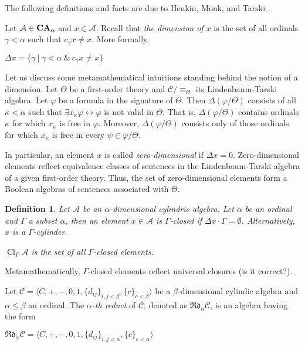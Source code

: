 \documentclass[a4paper]{article}
\theoremstyle{defin}
\newtheorem{defin}{Definition}
\theoremstyle{theorem}
\theoremstyle{prop}
\theoremstyle{lemma}
\theoremstyle{fact}
\theoremstyle{ex}
\theoremstyle{col}
\begin{document}
The following definitions and facts are due to Henkin, Monk, and Tarski \cite{henkin1971cylindric}.

Let $\mathcal{A} \in {\bf CA}_{\alpha}$ and $x \in \mathcal{A}$. Recall that \emph{the dimension of $x$}
is the set of all ordinals $\gamma < \alpha$ such that $c_\gamma x \neq x$. More formally,
\begin{center}
  $\Delta x = \{ \gamma \: | \: \gamma < \alpha \: \& \: c_\gamma x \neq x\}$
\end{center}

Let us discuss some metamathematical intuitions standing behind the notion of a dimension. Let $\Theta$ be a first-order theory and $\mathcal{C}/\equiv_{\Theta}$ its Lindenbaum-Tarski algebra. Let $\varphi$ be a formula in the signature of $\Theta$. Then $\Delta(\varphi/\Theta)$ consists of all $\kappa < \alpha$ such that $\exists x_{\kappa} \varphi \leftrightarrow \varphi$ is not valid in $\Theta$.
That is, $\Delta(\varphi/\Theta)$ contains ordinals $\kappa$ for which $x_{\kappa}$ is free in $\varphi$. Moreover, $\Delta(\varphi/\Theta)$ consists only of those ordinals for which $x_{\kappa}$ is free in every $\psi \in \varphi/\Theta$.

In particular, an element $x$ is called \emph{zero-dimensional} if $\Delta x = 0$. Zero-dimensional elements reflect equivalence classes of sentences in the Lindenbaum-Tarski algebra of a given first-order theory. Thus, the set of zero-dimensional elements form a Boolean algebras of sentences associated with $\Theta$.

\begin{defin}
  Let $\mathcal{A}$ be an $\alpha$-dimensional cylindric algebra. Let $\alpha$ be an ordinal and $\Gamma$ a subset $\alpha$, then an element $x \in \mathcal{A}$ is $\Gamma$-closed if $\Delta x \cdot \Gamma = \emptyset$. Alternatively, $x$ is a $\Gamma$-cylinder.

 $\operatorname{Cl}_{\Gamma}\mathcal{A}$ is the set of all $\Gamma$-closed elements.
\end{defin}

Metamathematically, $\Gamma$-closed elements reflect universal closures (is it correct?).

Let $\mathcal{C} = \langle C, +, -, 0, 1, \{d_{ij}\}_{i, j < \beta}, \{ c \}_{c < \beta} \rangle$ be a $\beta$-dimensional cylindic algebra and $\alpha \leq \beta$ an ordinal. The \emph{$\alpha$-th reduct} of $\mathcal{C}$, denoted as $\mathfrak{R}\mathfrak{d}_{\alpha}\mathcal{C}$, is an algebra having the form
\begin{center}
$\mathfrak{R}\mathfrak{d}_{\alpha}\mathcal{C} = \langle C, +, -, 0, 1, \{d_{ij}\}_{i, j < \alpha}, \{ c \}_{c < \alpha} \rangle$
\end{center}
\end{document}
